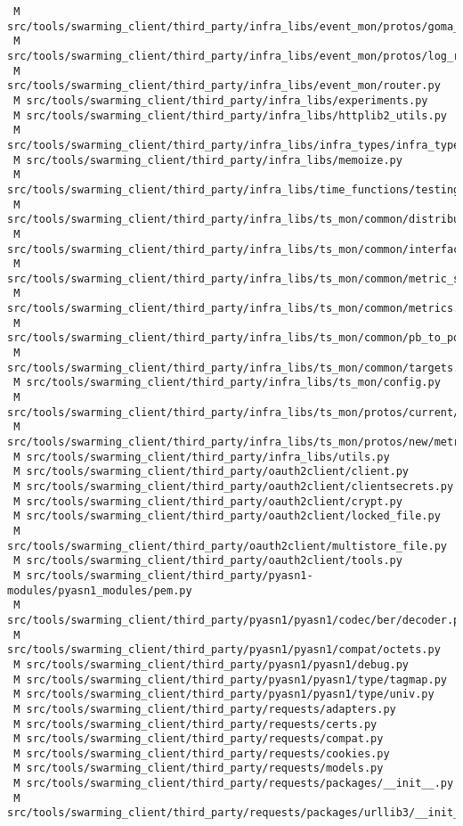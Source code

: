 \documentclass{article}
\begin{document}
\begin{verbatim}
 M src/tools/swarming_client/third_party/infra_libs/event_mon/protos/goma_stats_pb2.py
 M src/tools/swarming_client/third_party/infra_libs/event_mon/protos/log_request_lite_pb2.py
 M src/tools/swarming_client/third_party/infra_libs/event_mon/router.py
 M src/tools/swarming_client/third_party/infra_libs/experiments.py
 M src/tools/swarming_client/third_party/infra_libs/httplib2_utils.py
 M src/tools/swarming_client/third_party/infra_libs/infra_types/infra_types.py
 M src/tools/swarming_client/third_party/infra_libs/memoize.py
 M src/tools/swarming_client/third_party/infra_libs/time_functions/testing.py
 M src/tools/swarming_client/third_party/infra_libs/ts_mon/common/distribution.py
 M src/tools/swarming_client/third_party/infra_libs/ts_mon/common/interface.py
 M src/tools/swarming_client/third_party/infra_libs/ts_mon/common/metric_store.py
 M src/tools/swarming_client/third_party/infra_libs/ts_mon/common/metrics.py
 M src/tools/swarming_client/third_party/infra_libs/ts_mon/common/pb_to_popo.py
 M src/tools/swarming_client/third_party/infra_libs/ts_mon/common/targets.py
 M src/tools/swarming_client/third_party/infra_libs/ts_mon/config.py
 M src/tools/swarming_client/third_party/infra_libs/ts_mon/protos/current/metrics_pb2.py
 M src/tools/swarming_client/third_party/infra_libs/ts_mon/protos/new/metrics_pb2.py
 M src/tools/swarming_client/third_party/infra_libs/utils.py
 M src/tools/swarming_client/third_party/oauth2client/client.py
 M src/tools/swarming_client/third_party/oauth2client/clientsecrets.py
 M src/tools/swarming_client/third_party/oauth2client/crypt.py
 M src/tools/swarming_client/third_party/oauth2client/locked_file.py
 M src/tools/swarming_client/third_party/oauth2client/multistore_file.py
 M src/tools/swarming_client/third_party/oauth2client/tools.py
 M src/tools/swarming_client/third_party/pyasn1-modules/pyasn1_modules/pem.py
 M src/tools/swarming_client/third_party/pyasn1/pyasn1/codec/ber/decoder.py
 M src/tools/swarming_client/third_party/pyasn1/pyasn1/compat/octets.py
 M src/tools/swarming_client/third_party/pyasn1/pyasn1/debug.py
 M src/tools/swarming_client/third_party/pyasn1/pyasn1/type/tagmap.py
 M src/tools/swarming_client/third_party/pyasn1/pyasn1/type/univ.py
 M src/tools/swarming_client/third_party/requests/adapters.py
 M src/tools/swarming_client/third_party/requests/certs.py
 M src/tools/swarming_client/third_party/requests/compat.py
 M src/tools/swarming_client/third_party/requests/cookies.py
 M src/tools/swarming_client/third_party/requests/models.py
 M src/tools/swarming_client/third_party/requests/packages/__init__.py
 M src/tools/swarming_client/third_party/requests/packages/urllib3/__init__.py

\end{verbatim}
\end{document}
